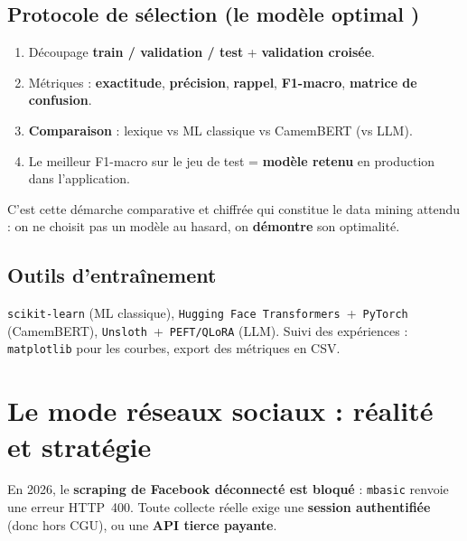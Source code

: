 \documentclass[11pt,a4paper]{article}
\newcommand{\code}[1]{\texttt{\small #1}}
\begin{document}
\subsection{Protocole de sélection (le \og modèle optimal \fg{})}
\begin{enumerate}[leftmargin=1.2cm,nosep]
  \item Découpage \textbf{train / validation / test} + \textbf{validation croisée}.
  \item Métriques : \textbf{exactitude}, \textbf{précision}, \textbf{rappel},
        \textbf{F1-macro}, \textbf{matrice de confusion}.
  \item \textbf{Comparaison} : lexique vs ML classique vs CamemBERT (vs LLM).
  \item Le meilleur F1-macro sur le jeu de test = \textbf{modèle retenu} en
        production dans l'application.
\end{enumerate}
\begin{repere}
C'est cette démarche comparative et chiffrée qui constitue le \og data mining \fg{}
attendu : on ne choisit pas un modèle au hasard, on \textbf{démontre} son
optimalité.
\end{repere}

\subsection{Outils d'entraînement}
\code{scikit-learn} (ML classique), \code{Hugging Face Transformers}~+~\code{PyTorch}
(CamemBERT), \code{Unsloth}~+~\code{PEFT/QLoRA} (LLM). Suivi des expériences :
\code{matplotlib} pour les courbes, export des métriques en CSV.

\section{Le mode \og réseaux sociaux \fg{} : réalité et stratégie}

\begin{alerte}
En 2026, le \textbf{scraping de Facebook déconnecté est bloqué} : \code{mbasic}
renvoie une erreur HTTP~400. Toute collecte réelle exige une \textbf{session
authentifiée} (donc hors CGU), ou une \textbf{API tierce payante}.
\end{alerte}
\end{document}
